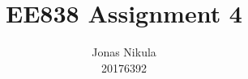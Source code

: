 \documentclass{article}
\title{EE838 Assignment 4} %
\author{Jonas Nikula \\ 20176392} %
\begin{document}
\maketitle %





\printbibliography{}

\end{document}
